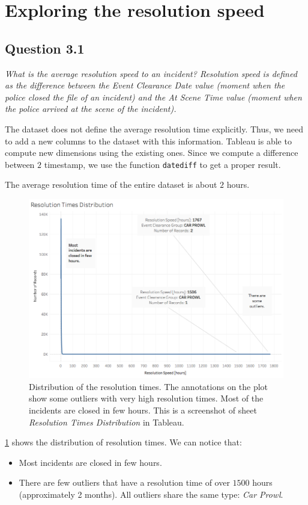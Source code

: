 \section{Exploring the resolution speed}

\subsection*{Question 3.1}
\textit{What is the average resolution speed to an incident? Resolution speed is defined as the difference between the Event Clearance Date value (moment when the police closed the file of an incident) and the At Scene Time value (moment when the police arrived at the scene of the incident).}

The dataset does not define the average resolution time explicitly.
Thus, we need to add a new columns to the dataset with this information.
Tableau is able to compute new dimensions using the existing ones.
Since we compute a difference between $2$ timestamp, we use the function \texttt{datediff} to get a proper result.

The average resolution time of the entire dataset is about $2$ hours.

\begin{figure}[h]
	\centering
	\includegraphics[width=0.9\columnwidth]{figures/3_1_resolution_speed_outliers}
	\caption{Distribution of the resolution times. The annotations on the plot show some outliers with very high resolution times. Most of the incidents are closed in few hours. This is a screenshot of sheet \textit{Resolution Times Distribution} in Tableau.}
	\label{fig:3_1_resolution_speed_outliers}
\end{figure}

\cref{fig:3_1_resolution_speed_outliers} shows the distribution of resolution times.
We can notice that:
\begin{itemize}
    \item Most incidents are closed in few hours.
    \item There are few outliers that have a resolution time of over $1500$ hours (approximately 2 months). All outliers share the same type: \textit{Car Prowl}.
\end{itemize}

